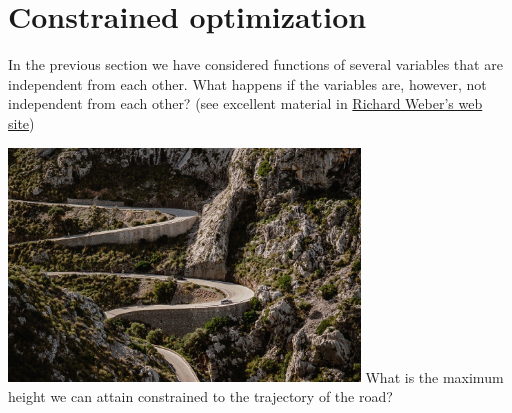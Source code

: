 \documentclass[c]{beamer}
\begin{document}
\section{Constrained optimization}
\begin{frame}
In the previous section we have considered functions of several variables that are independent from each other. What happens if the variables are, however, not independent from each other? (see excellent material in \href{https://www.statslab.cam.ac.uk/~rrw1/}{Richard Weber's web site})

  \begin{center}
    \includegraphics[width=0.7\textwidth]{../figures/mallorca.jpg}\newline
    What is the maximum height we can attain constrained to the trajectory of the road?
  \end{center}
\end{frame}
\end{document}
